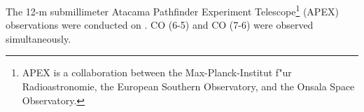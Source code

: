 The 12-m submillimeter Atacama Pathfinder Experiment Telescope\footnote{    APEX is a collaboration between the Max-Planck-Institut f"ur Radioastronomie, the European Southern Observatory, and the Onsala Space Observatory.} (APEX) observations were conducted on . CO (6-5) and CO (7-6) were observed simultaneously. 